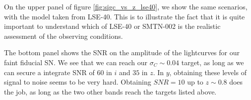 \documentclass[\docopts]{\docclass}
\begin{document}
On the upper panel of figure \ref{fig:sigc_vs_z_lse40}, we show the
same scenarios, with the model taken from LSE-40.  This is to
illustrate the fact that it is quite important to understand which of
LSE-40 or SMTN-002 is the realistic assessment of the observing
conditions.

The bottom panel shows the SNR on the amplitude of the lightcurves for
our faint fiducial SN. We see that we can reach our $\sigma_C \sim
0.04$ target, as long as we can secure a integrate SNR of 60 in $i$
and $35$ in $z$.  In $y$, obtaining these levels of signal to noise
seems to be very hard. Obtaining $SNR=10$ up to $z\sim 0.8$ does the
job, as long as the two other bands reach the targets listed above.


\end{document}
